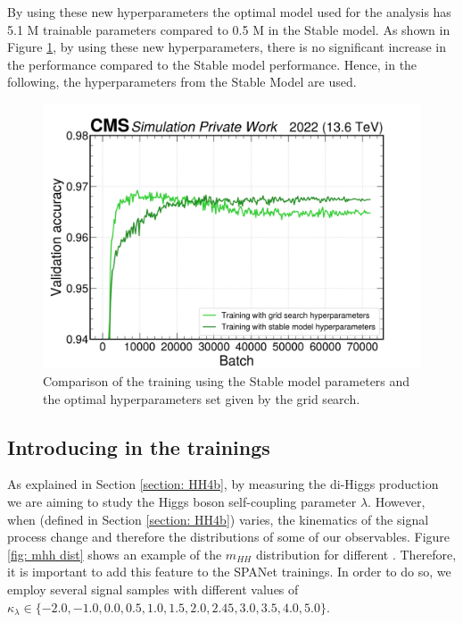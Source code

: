 \newpage
By using these new hyperparameters the optimal model used for the analysis has 5.1 M trainable parameters compared to 0.5 M in the Stable model. 
As shown in Figure \ref{fig: comp grid search}, by using these new hyperparameters, 
there is no significant increase in the performance compared to the Stable model performance. 
Hence, in the following, the hyperparameters from the Stable Model are used.

\begin{figure}[hbt]
    \centering
    \includegraphics[width=0.6\linewidth]{Images/6.Improving/Grid search/grid search.png}
    \caption{Comparison of the training using the Stable model parameters and the optimal hyperparameters set given by the grid search.}
    \label{fig: comp grid search}
\end{figure}


\clearpage

\subsection{Introducing \kl in the trainings} \label{subsection: kl}

As explained in Section \ref{section: HH4b}, by measuring the di-Higgs production we are aiming to study 
the Higgs boson self-coupling parameter $\lambda$. However, when \kl (defined in Section \ref{section: HH4b}) varies, the kinematics 
of the signal process change and therefore the distributions of some of our observables. Figure \ref{fig: mhh dist} shows an example of the $m_{HH}$ distribution for different \kl. Therefore, it is important to add this feature to the SPANet trainings. 
In order to do so, we employ several signal samples with different values of $\kappa_\lambda 
\in \{-2.0, -1.0, 0.0, 0.5, 1.0, 1.5, 2.0, 2.45, 3.0, 3.5, 4.0, 5.0\}$. 


